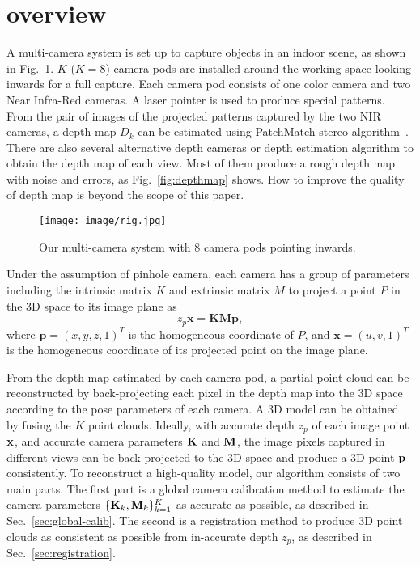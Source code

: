 \section{overview}
\label{sec:overview}



A multi-camera system is set up to capture objects in an indoor scene, as shown in Fig.~\ref{fig:rig}. 
%
$K$ ($K=8$) camera pods are installed around the working space looking inwards for a full capture. 
Each camera pod consists of one color camera and two Near Infra-Red cameras. A laser pointer is used to produce special patterns. From the pair of images of the projected patterns captured by the two NIR cameras, a depth map $D_k$ can be estimated using PatchMatch stereo algorithm~\cite{Bleyer2011PatchMatch}.
There are also several alternative depth cameras or depth estimation algorithm to obtain the depth map of each view. Most of them produce a rough depth map with noise and errors, as Fig.~\ref{fig:depthmap} shows.
How to improve the quality of depth map is beyond the scope of this paper. 

\begin{figure}
	\centering
	\texttt{[image: image/rig.jpg]}
	\caption{Our multi-camera system with 8 camera pods pointing inwards.}
	\label{fig:rig}
\end{figure}


%
Under the assumption of pinhole camera, each camera has a group of parameters including the intrinsic matrix $K$ and extrinsic matrix $M$ to project a point $P$ in the 3D space to its image plane as 
\begin{equation}\label{eq:cam-proj}
z_{p}\mathbf{x}=\mathbf{K}\mathbf{M}\mathbf{p},
\end{equation}
where $\mathbf{p}=(x,y,z,1)^{T}$ is the homogeneous coordinate of $P$, and $\mathbf{x}=(u,v,1)^{T}$ is the homogeneous coordinate of its projected point on the image plane. 
%

From the depth map estimated by each camera pod, a partial point cloud can be reconstructed by back-projecting each pixel in the depth map into the 3D space according to the pose parameters of each camera. 
%
A 3D model can be obtained by fusing the $K$ point clouds. 
%
%
Ideally, with accurate depth $z_p$ of each image point $\mathbf{x}$, and accurate camera parameters $\mathbf{K}$ and $\mathbf{M}$, the image pixels captured in different views can be back-projected to the 3D space and produce a 3D point $\mathbf{p}$ consistently. 
To reconstruct a high-quality model, our algorithm consists of two main parts. 
%
The first part is a global camera calibration method to estimate the camera parameters $\{\mathbf{K}_k, \mathbf{M}_k\}^{K}_{k=1}$ as accurate as possible, as described in Sec.~\ref{sec:global-calib}.
The second is a registration method to produce 3D point clouds as consistent as possible from in-accurate depth $z_p$, as described in Sec.~\ref{sec:registration}.  



